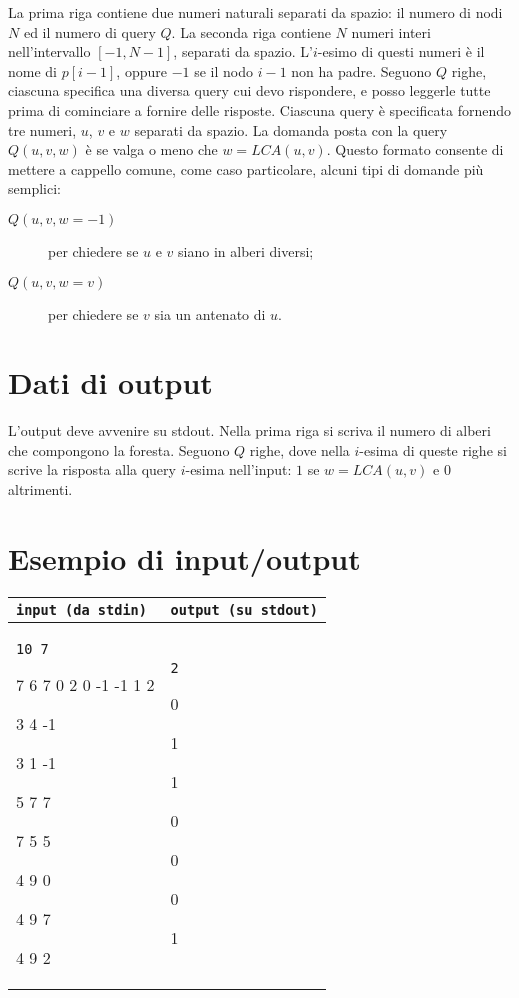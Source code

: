 \documentclass[a4paper,11pt]{article}
\newcommand{\file}[1]{\texttt{#1}}
\newcommand{\esempioB}[2]{
\noindent\begin{minipage}{\textwidth}
\begin{tabular}{|p{9cm}|p{7cm}|}
	\hline
      \textbf{\file{input (da stdin)}} & \textbf{\file{output (su stdout)}}\\
	\hline
	\tt \small #1 &
	\tt \small #2 \\
	\hline
\end{tabular}
\end{minipage}
}
\begin{document}
La prima riga contiene due numeri naturali separati da spazio:
il numero di nodi $N$ ed il numero di query $Q$.
La seconda riga contiene $N$ numeri interi nell'intervallo $[-1,N-1]$, separati da spazio.
L'$i$-esimo di questi numeri è il nome di $p[i-1]$, oppure $-1$ se il nodo $i-1$ non ha padre.
Seguono $Q$ righe, ciascuna specifica una diversa query cui devo rispondere, e posso leggerle tutte prima di cominciare a fornire delle risposte.
Ciascuna query è specificata fornendo tre numeri, $u$, $v$ e $w$ separati da spazio. La domanda posta con la query $Q(u,v,w)$ è se valga o meno che $w=LCA(u,v)$.
Questo formato consente di mettere a cappello comune, come caso particolare, alcuni tipi di domande più semplici:
\begin{description}
  \item[$Q(u,v,w=-1)$] per chiedere se $u$ e $v$ siano in alberi diversi;
  \item[$Q(u,v,w=v)$] per chiedere se $v$ sia un antenato di $u$.
\end{description}


\section*{Dati di output}

L'output deve avvenire su stdout.
Nella prima riga si scriva il numero di alberi che compongono la foresta.
Seguono $Q$ righe, dove nella $i$-esima di queste righe si scrive la risposta alla query $i$-esima nell'input: $1$ se $w=LCA(u,v)$ e $0$ altrimenti.

\section*{Esempio di input/output}

\esempioB{10 7

7 6 7 0 2 0 -1 -1 1 2

3 4 -1

3 1 -1

5 7 7

7 5 5

4 9 0

4 9 7

4 9 2
}{2

0

1

1

0

0

0

1}
\end{document}

